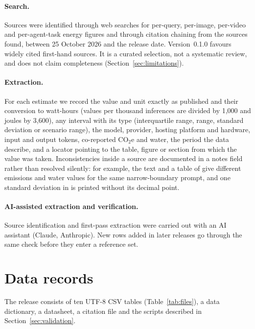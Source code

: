 \documentclass[11pt]{article}
\newcommand{\version}{0.1.0}
\begin{document}
\paragraph{Search.}
Sources were identified through web searches for per-query, per-image, per-video and per-agent-task energy figures and through citation chaining from the sources found, between 25 October 2026 and the release date. Version~\version{} favours widely cited first-hand sources. It is a curated selection, not a systematic review, and does not claim completeness (Section~\ref{sec:limitations}).

\paragraph{Extraction.}
For each estimate we record the value and unit exactly as published and their conversion to watt-hours (values per thousand inferences are divided by 1{,}000 and joules by 3{,}600), any interval with its type (interquartile range, range, standard deviation or scenario range), the model, provider, hosting platform and hardware, input and output tokens, co-reported CO$_2$e and water, the period the data describe, and a locator pointing to the table, figure or section from which the value was taken. Inconsistencies inside a source are documented in a notes field rather than resolved silently: for example, the text and a table of \citet{elsworth2025measuring} give different emissions and water values for the same narrow-boundary prompt, and one standard deviation in \citet{jegham2025hungry} is printed without its decimal point.

\paragraph{AI-assisted extraction and verification.}
Source identification and first-pass extraction were carried out with an AI assistant (Claude, Anthropic). \verificationSentence{} New rows added in later releases go through the same check before they enter a reference set.

\section{Data records}
\label{sec:records}

The release consists of ten UTF-8 CSV tables (Table~\ref{tab:files}), a data dictionary, a datasheet, a citation file and the scripts described in Section~\ref{sec:validation}.
\end{document}
